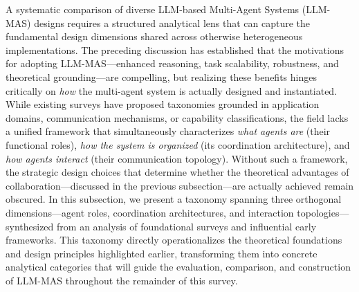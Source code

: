 \documentclass[11pt]{article}
\begin{document}
A systematic comparison of diverse LLM-based Multi-Agent Systems (LLM-MAS) designs requires a structured analytical lens that can capture the fundamental design dimensions shared across otherwise heterogeneous implementations. The preceding discussion has established that the motivations for adopting LLM-MAS---enhanced reasoning, task scalability, robustness, and theoretical grounding---are compelling, but realizing these benefits hinges critically on \emph{how} the multi-agent system is actually designed and instantiated. While existing surveys have proposed taxonomies grounded in application domains, communication mechanisms, or capability classifications, the field lacks a unified framework that simultaneously characterizes \emph{what agents are} (their functional roles), \emph{how the system is organized} (its coordination architecture), and \emph{how agents interact} (their communication topology). Without such a framework, the strategic design choices that determine whether the theoretical advantages of collaboration---discussed in the previous subsection---are actually achieved remain obscured. In this subsection, we present a taxonomy spanning three orthogonal dimensions---agent roles, coordination architectures, and interaction topologies---synthesized from an analysis of foundational surveys and influential early frameworks. This taxonomy directly operationalizes the theoretical foundations and design principles highlighted earlier, transforming them into concrete analytical categories that will guide the evaluation, comparison, and construction of LLM-MAS throughout the remainder of this survey.
\end{document}
